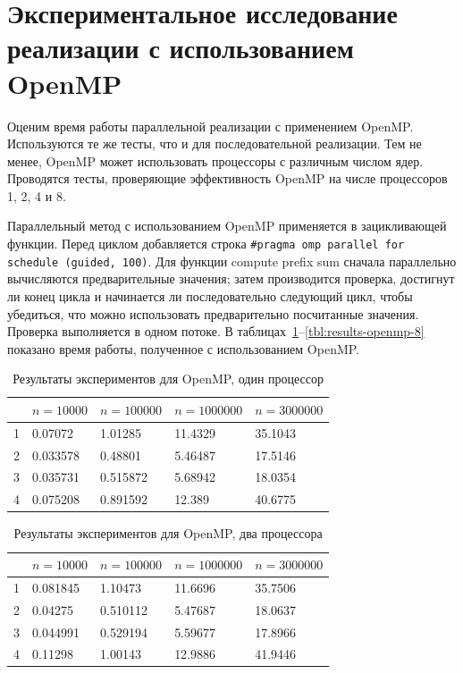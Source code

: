 \documentclass[specification,annotation]{itmo-student-thesis}
\begin{document}
\section{Экспериментальное исследование реализации с использованием OpenMP}

Оценим время работы параллельной реализации с применением OpenMP. Используются те же тесты, что и для последовательной реализации.
Тем не менее, OpenMP может использовать процессоры с различным числом ядер. Проводятся тесты, 
проверяющие эффективность OpenMP на числе процессоров 1, 2, 4 и 8.

Параллельный метод с использованием OpenMP применяется в зацикливающей функции. Перед циклом добавляется строка 
\texttt{\#pragma omp parallel for schedule (guided, 100)}. 
Для функции compute prefix sum сначала параллельно вычисляются предварительные значения; затем 
производится проверка, достигнут ли конец цикла и начинается ли последовательно следующий цикл, 
чтобы убедиться, что можно использовать предварительно посчитанные значения. Проверка выполняется 
в одном потоке. В таблицах~\ref{tbl:results-openmp-1}--\ref{tbl:results-openmp-8} показано время 
работы, полученное с использованием OpenMP.

\begin{table}[!ht]
\centering
\begin{tabular}{|l|l|l|l|l|}\hline
 & $n=10000$ & $n=100000$ & $n=1000000$ & $n=3000000$ \\\hline
1 & 0.07072 & 1.01285 & 11.4329 & 35.1043 \\\hline
2 & 0.033578 & 0.48801 & 5.46487 & 17.5146 \\\hline
3 & 0.035731 & 0.515872 & 5.68942 & 18.0354 \\\hline
4 & 0.075208 & 0.891592 & 12.389 & 40.6775 \\\hline
\end{tabular}
\caption{Результаты экспериментов для OpenMP, один процессор}\label{tbl:results-openmp-1}
\end{table}

\begin{table}[!ht]
\centering
\begin{tabular}{|l|l|l|l|l|}\hline
 & $n=10000$ & $n=100000$ & $n=1000000$ & $n=3000000$ \\\hline
1 & 0.081845 & 1.10473 & 11.6696 & 35.7506 \\\hline
2 & 0.04275 & 0.510112 & 5.47687 & 18.0637 \\\hline
3 & 0.044991 & 0.529194 & 5.59677 & 17.8966 \\\hline
4 & 0.11298 & 1.00143 & 12.9886 & 41.9446 \\\hline
\end{tabular}
\caption{Результаты экспериментов для OpenMP, два процессора}\label{tbl:results-openmp-2}
\end{table}
\end{document}
